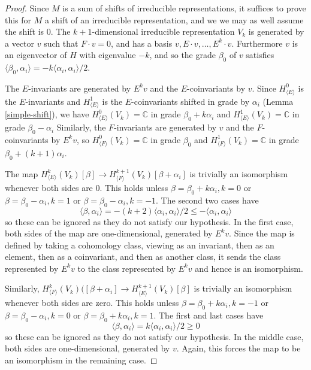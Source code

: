 \documentclass[11pt,letterpaper]{article}
\theoremstyle{definition}
\theoremstyle{remark}
\numberwithin{equation}{section}
\theoremstyle{dotless}
\newcommand{\LieH}{H}
\begin{document}
\begin{proof} Since $M$ is a sum of shifts of irreducible representations, it suffices to prove this for $M$ a shift of an irreducible representation, and we we may as well assume the shift is $0$.  The $k+1$-dimensional irreducible representation $V_k$ is generated by a vector $v$ such that $F \cdot v=0$, and has a basis $v, E \cdot v,\dots, E^k \cdot v$. Furthermore $v$ is an eigenvector of $H$ with eigenvalue $-k$, and so the grade $\beta_0$ of $v$ satisfies $\langle \beta_0, \alpha _i \rangle= - k \langle \alpha_i,\alpha_i \rangle/2$. 

 The $E$-invariants are generated by $E^k v$ and the $E$-coinvariants by $v $. Since $\LieH^0_{\langle E \rangle} $ is the $E$-invariants and $\LieH^1_{\langle E \rangle}$ is the $E$-coinvariants shifted in grade by $\alpha_i$ (Lemma \ref{simple-shift}),  we have $\LieH^0_{\langle E \rangle}(V_k)  = \mathbb C$ in grade $\beta_0 +k \alpha_i$ and $\LieH^1_{\langle E \rangle} (V_k) = \mathbb C$ in grade $\beta_0 - \alpha_i$ Similarly, the $F$-invariants are generated by $v$ and the $F$-coinvariants by $E ^k v$, so $\LieH^0_{\langle F \rangle}(V_k)  = \mathbb C$ in grade $\beta_0$  and $\LieH^1_{\langle F \rangle} (V_k) = \mathbb C$ in grade $\beta_0+ (k+1) \alpha_i$.

The map $ \LieH^{k}_{\langle E \rangle} ( V_k) [\beta] \to   \LieH^{k+1}_{\langle F \rangle} ( V_k) [\beta+\alpha_i] $ is trivially an isomorphism whenever both sides are $0$. This holds unless $ \beta = \beta_0+ k \alpha_i , k=0$ or $\beta= \beta_0 -\alpha_i , k=1$ or $\beta= \beta_0- \alpha_i, k=-1$. The second two cases have \[ \langle \beta, \alpha_i \rangle = - (k+2) \langle \alpha_i, \alpha_i \rangle/2 \leq - \langle \alpha_i, \alpha_i \rangle  \]  so these can be ignored as they do not satisfy our hypothesis. In the first case, both sides of the map are one-dimensional, generated by $E^k v$. Since the map is defined by taking a cohomology class, viewing as an invariant, then as an element, then as a coinvariant, and then as another class, it sends the class represented by $E^k v$ to the class represented by $E^k v$ and hence is an isomorphism.

Similarly, $ \LieH^{k}_{\langle F \rangle} ( V_k)( [\beta+ \alpha_i]  \to   \LieH^{k+1}_{\langle E \rangle} ( V_k)  [\beta]$ is trivially an isomorphism whenever both sides are zero. This holds unless $\beta =  \beta_0 + k\alpha_i  , k=-1$ or $ \beta = \beta_0-\alpha_i , k=0$ or  $\beta= \beta_0 + k \alpha_i , k=1$. The first and last cases have \[\langle \beta, \alpha_i \rangle = k \langle \alpha_i , \alpha_i \rangle /2  \geq 0\] so these can be ignored as they do not satisfy our hypothesis. In the middle case, both sides are one-dimensional, generated by $v$. Again, this forces the map to be an isomorphism in the remaining case.\end{proof} 
\end{document}
